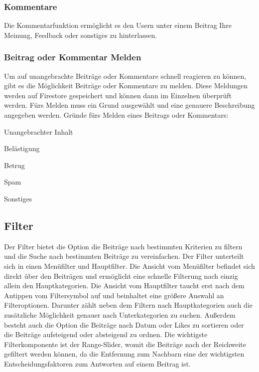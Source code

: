 \subsubsection{Kommentare}
\author{Sandin Habibovic}
Die Kommentarfunktion ermöglicht es den Usern unter einem Beitrag Ihre Meinung, Feedback oder sonstiges zu hinterlassen.

\subsubsection{Beitrag oder Kommentar Melden}
\author{Sandin Habibovic}
Um auf unangebrachte Beiträge oder Kommentare schnell reagieren zu können, gibt es die Möglichkeit Beiträge oder Kommentare zu melden. Diese Meldungen werden auf Firestore gespeichert und können dann im Einzelnen überprüft werden. Fürs Melden muss ein Grund ausgewählt und eine genauere Beschreibung angegeben werden.
Gründe fürs Melden eines Beitrags oder Kommentars:

\begin{compactitem}
    \item Unangebrachter Inhalt
    \item Belästigung
    \item Betrug
    \item Spam
    \item Sonstiges
\end{compactitem}

\subsection{Filter}
\author{Sandin Habibovic}
Der Filter bietet die Option die Beiträge nach bestimmten Kriterien zu filtern und die Suche nach bestimmten Beiträge zu vereinfachen. Der Filter unterteilt sich in einen Menüfilter und Hauptfilter. 
Die Ansicht vom Menüfilter befindet sich direkt über den Beiträgen und ermöglicht eine schnelle Filterung nach einzig allein den Hauptkategorien.
Die Ansicht vom Hauptfilter taucht erst nach dem Antippen vom Filtersymbol auf und beinhaltet eine größere Auswahl an Filteroptionen. Darunter zählt neben dem Filtern nach Hauptkategorien auch die zusätzliche Möglichkeit genauer nach Unterkategorien zu suchen. Außerdem besteht auch die Option die Beiträge nach Datum oder Likes zu sortieren oder die Beiträge aufsteigend oder absteigend zu ordnen. Die wichtigste Filterkomponente ist der Range-Slider, womit die Beiträge nach der Reichweite gefiltert werden können, da die Entfernung zum Nachbarn eine der wichtigsten Entscheidungsfaktoren zum Antworten auf einem Beitrag ist.

